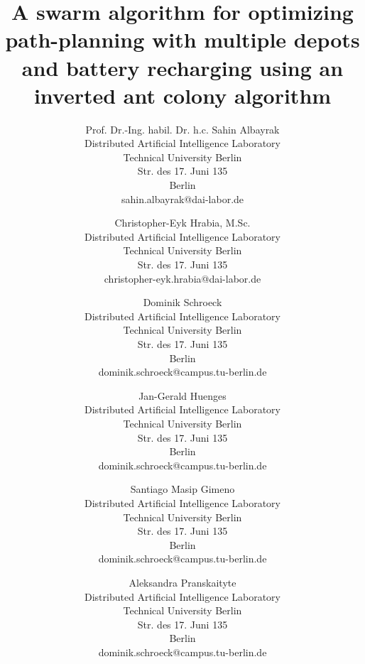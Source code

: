\documentclass{scspaperproc}
\theoremstyle{scsthe}
\begin{document}
\title{A swarm algorithm for optimizing path-planning with multiple depots and battery recharging using an inverted ant colony algorithm}

\author{Prof. Dr.-Ing. habil. Dr. h.c. Sahin Albayrak\\[12pt]
Distributed Artificial Intelligence Laboratory \\
Technical University Berlin \\
Str. des 17. Juni 135 \\
Berlin \\
sahin.albayrak@dai-labor.de
\and
Christopher-Eyk Hrabia, M.Sc. \\ [12pt]
Distributed Artificial Intelligence Laboratory \\
Technical University Berlin \\
Str. des 17. Juni 135 \\
christopher-eyk.hrabia@dai-labor.de \\
\and
Dominik Schroeck \\ [12pt]
Distributed Artificial Intelligence Laboratory \\
Technical University Berlin \\
Str. des 17. Juni 135 \\
Berlin \\
dominik.schroeck@campus.tu-berlin.de \\
\and
Jan-Gerald Huenges \\[12pt]
Distributed Artificial Intelligence Laboratory \\
Technical University Berlin \\
Str. des 17. Juni 135 \\
Berlin \\
dominik.schroeck@campus.tu-berlin.de \\
\and
Santiago Masip Gimeno \\ [12pt]
Distributed Artificial Intelligence Laboratory \\
Technical University Berlin \\
Str. des 17. Juni 135 \\
Berlin \\
dominik.schroeck@campus.tu-berlin.de \\
\and
Aleksandra Pranskaityte \\ [12pt]
Distributed Artificial Intelligence Laboratory \\
Technical University Berlin \\
Str. des 17. Juni 135 \\
Berlin \\
dominik.schroeck@campus.tu-berlin.de \\
}
\end{document}
